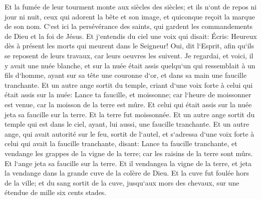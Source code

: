 \verse Et la fumée de leur tourment monte aux siècles des siècles; et ils n`ont de repos ni jour ni nuit, ceux qui adorent la bête et son image, et quiconque reçoit la marque de son nom. 
\verse C`est ici la persévérance des saints, qui gardent les commandements de Dieu et la foi de Jésus. 
\verse Et j`entendis du ciel une voix qui disait: Écris: Heureux dès à présent les morts qui meurent dans le Seigneur! Oui, dit l`Esprit, afin qu`ils se reposent de leurs travaux, car leurs oeuvres les suivent. 
\verse Je regardai, et voici, il y avait une nuée blanche, et sur la nuée était assis quelqu`un qui ressemblait à un fils d`homme, ayant sur sa tête une couronne d`or, et dans sa main une faucille tranchante. 
\verse Et un autre ange sortit du temple, criant d`une voix forte à celui qui était assis sur la nuée: Lance ta faucille, et moissonne; car l`heure de moissonner est venue, car la moisson de la terre est mûre. 
\verse Et celui qui était assis sur la nuée jeta sa faucille sur la terre. Et la terre fut moissonnée. 
\verse Et un autre ange sortit du temple qui est dans le ciel, ayant, lui aussi, une faucille tranchante. 
\verse Et un autre ange, qui avait autorité sur le feu, sortit de l`autel, et s`adressa d`une voix forte à celui qui avait la faucille tranchante, disant: Lance ta faucille tranchante, et vendange les grappes de la vigne de la terre; car les raisins de la terre sont mûrs. 
\verse Et l`ange jeta sa faucille sur la terre. Et il vendangea la vigne de la terre, et jeta la vendange dans la grande cuve de la colère de Dieu. 
\verse Et la cuve fut foulée hors de la ville; et du sang sortit de la cuve, jusqu`aux mors des chevaux, sur une étendue de mille six cents stades. 

